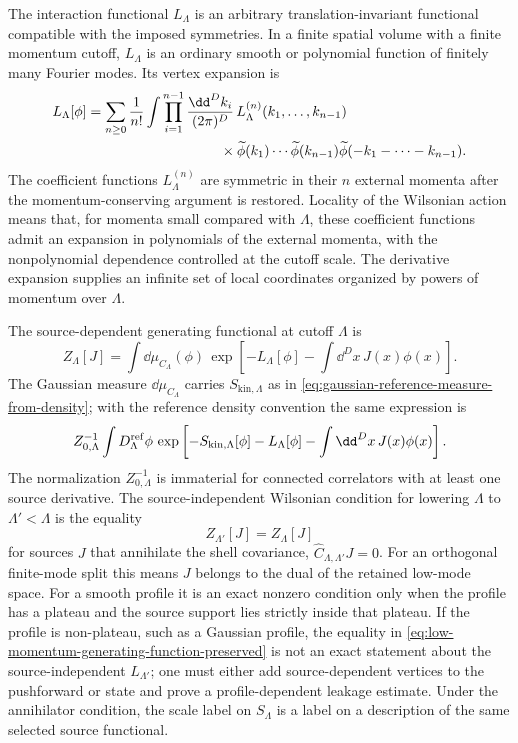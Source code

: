 The interaction functional \(L_\Lambda\) is an arbitrary translation-invariant
functional compatible with the imposed symmetries.  In a finite spatial
volume with a finite momentum cutoff, \(L_\Lambda\) is an ordinary smooth or
polynomial function of finitely many Fourier modes.  Its vertex expansion is
\begin{align}
  L_\Lambda[\phi]
  &=
  \sum_{n\geq0}\frac1{n!}
  \int\prod_{i=1}^{n-1}\frac{\dd^Dk_i}{(2\pi)^D}\,
  L_\Lambda^{(n)}(k_1,\ldots,k_{n-1})
  \notag\\
  &\hspace{3.35cm}\times
  \widetilde\phi(k_1)\cdots\widetilde\phi(k_{n-1})
  \widetilde\phi(-k_1-\cdots-k_{n-1}).
  \label{eq:general-wilsonian-interaction}
\end{align}
The coefficient functions \(L_\Lambda^{(n)}\) are symmetric in their \(n\)
external momenta after the momentum-conserving argument is restored.  Locality
of the Wilsonian action means that, for momenta small compared with
\(\Lambda\), these coefficient functions admit an expansion in polynomials of
the external momenta, with the nonpolynomial dependence controlled at the
cutoff scale.  The derivative expansion supplies an infinite set of local
coordinates organized by powers of momentum over \(\Lambda\).

The source-dependent generating functional at cutoff \(\Lambda\) is
\begin{equation}
  Z_\Lambda[J]
  =
  \int\dd\mu_{C_\Lambda}(\phi)\,
  \exp\left[
    -L_\Lambda[\phi]
    -\int\dd^Dx\,J(x)\phi(x)
  \right].
  \label{eq:wilsonian-z-lambda}
\end{equation}
The Gaussian measure \(\dd\mu_{C_\Lambda}\) carries
\(S_{\mathrm{kin},\Lambda}\) as in
\eqref{eq:gaussian-reference-measure-from-density}; with the reference density
convention the same expression is
\[
  Z_{0,\Lambda}^{-1}
  \int D_\Lambda^{\rm ref}\phi\,
  \exp\left[
    -S_{\mathrm{kin},\Lambda}[\phi]
    -L_\Lambda[\phi]
    -\int\dd^Dx\,J(x)\phi(x)
  \right].
\]
The normalization \(Z_{0,\Lambda}^{-1}\) is immaterial for connected
correlators with at least one source derivative.
The source-independent Wilsonian condition for lowering \(\Lambda\) to
\(\Lambda'<\Lambda\) is the equality
\begin{equation}
  Z_{\Lambda'}[J]=Z_\Lambda[J]
  \label{eq:low-momentum-generating-function-preserved}
\end{equation}
for sources \(J\) that annihilate the shell covariance,
\(\widehat C_{\Lambda,\Lambda'}J=0\).  For an orthogonal finite-mode split this
means \(J\) belongs to the dual of the retained low-mode space.  For a smooth
profile it is an exact nonzero condition only when the profile has a plateau
and the source support lies strictly inside that plateau.  If the profile is
non-plateau, such as a Gaussian profile, the equality in
\eqref{eq:low-momentum-generating-function-preserved} is not an exact
statement about the source-independent \(L_{\Lambda'}\); one must either add
source-dependent vertices to the pushforward or state and prove a
profile-dependent leakage estimate.  Under the annihilator condition, the
scale label on \(S_\Lambda\) is a label on a description of the same selected
source functional.

